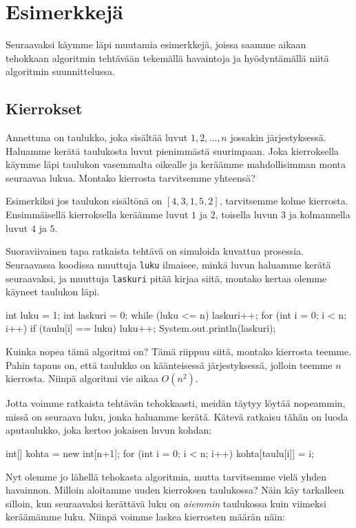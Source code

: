 \section{Esimerkkejä}

Seuraavaksi käymme läpi muutamia esimerkkejä,
joissa saamme aikaan tehokkaan algoritmin tehtävään
tekemällä havaintoja ja hyödyntämällä niitä algoritmin suunnittelussa.

\subsection{Kierrokset}

Annettuna on taulukko, joka sisältää luvut $1,2,\dots,n$
jossakin järjestyksessä.
Haluamme kerätä taulukosta luvut pienimmästä suurimpaan.
Joka kierroksella käymme läpi taulukon vasemmalta
oikealle ja keräämme mahdollisimman monta seuraavaa lukua.
Montako kierrosta tarvitsemme yhteensä?

Esimerkiksi jos taulukon sisältönä on $[4,3,1,5,2]$,
tarvitsemme kolme kierrosta.
Ensimmäisellä kierroksella keräämme luvut $1$ ja $2$,
toisella luvun $3$ ja kolmannella luvut $4$ ja $5$.

Suoraviivainen tapa ratkaista tehtävä on simuloida
kuvattua prosessia.
Seuraavassa koodissa muuttuja \texttt{luku} ilmaisee,
minkä luvun haluamme kerätä seuraavaksi,
ja muuttuja \texttt{laskuri} pitää kirjaa siitä, montako kertaa
olemme käyneet taulukon läpi.

\begin{code}
int luku = 1;
int laskuri = 0;
while (luku <= n) {
    laskuri++;
    for (int i = 0; i < n; i++) {
        if (taulu[i] == luku) luku++;
    }
}
System.out.println(laskuri);
\end{code}

Kuinka nopea tämä algoritmi on?
Tämä riippuu siitä, montako kierrosta teemme.
Pahin tapaus on, että taulukko on käänteisessä järjestyksessä,
jolloin teemme $n$ kierrosta.
Niinpä algoritmi vie aikaa $O(n^2)$.

Jotta voimme ratkaista tehtävän tehokkaasti,
meidän täytyy löytää nopeammin, missä on seuraava luku,
jonka haluamme kerätä.
Kätevä ratkaisu tähän on luoda aputaulukko,
joka kertoo jokaisen luvun kohdan:

\begin{code}
int[] kohta = new int[n+1];
for (int i = 0; i < n; i++) {
    kohta[taulu[i]] = i;
}
\end{code}

Nyt olemme jo lähellä tehokasta algoritmia, mutta
tarvitsemme vielä yhden havainnon.
Milloin aloitamme uuden kierroksen taulukossa?
Näin käy tarkalleen silloin, kun seuraavaksi kerättävä
luku on \emph{aiemmin} taulukossa kuin viimeksi
keräämämme luku.
Niinpä voimme laskea kierrosten määrän näin:

